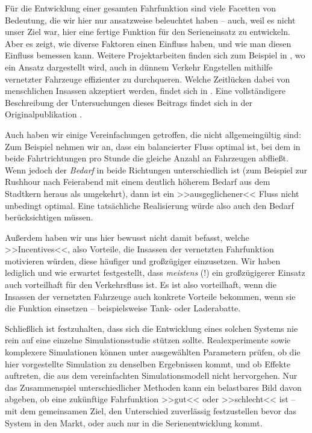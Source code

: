 Für die Entwicklung einer gesamten Fahrfunktion sind viele Facetten von Bedeutung, die wir hier nur ansatzweise beleuchtet haben -- auch, weil es nicht unser Ziel war, hier eine fertige Funktion für den Serieneinsatz zu entwickeln. Aber es zeigt, wie diverse Faktoren einen Einfluss haben, und wie man diesen Einfluss bemessen kann. Weitere Projektarbeiten finden sich zum Beispiel in \cite{naumann2017cooperativePlanning}, wo ein Ansatz dargestellt wird, auch in dünnem Verkehr Engstellen mithilfe vernetzter Fahrzeuge effizienter zu durchqueren. Welche Zeitlücken dabei von menschlichen Insassen akzeptiert werden, findet sich in \cite{ehrhardt2021gap}. Eine vollständigere Beschreibung der Untersuchungen dieses Beitrags findet sich in der Originalpublikation \cite{ziehn2023cooperative}.

Auch haben wir einige Vereinfachungen getroffen, die nicht allgemeingültig sind: Zum Beispiel nehmen wir an, dass ein balancierter Fluss optimal ist, bei dem in beide Fahrtrichtungen pro Stunde die gleiche Anzahl an Fahrzeugen abfließt. Wenn jedoch der \emph{Bedarf} in beide Richtungen unterschiedlich ist (zum Beispiel zur Rushhour nach Feierabend mit einem deutlich höherem Bedarf aus dem Stadtkern heraus als umgekehrt), dann ist ein >>ausgeglichener<< Fluss nicht unbedingt optimal. Eine tatsächliche Realisierung würde also auch den Bedarf berücksichtigen müssen.

Außerdem haben wir uns hier bewusst nicht damit befasst, welche >>Incentives<<, also Vorteile, die Insassen der vernetzten Fahrfunktion motivieren würden, diese häufiger und großzügiger einzusetzen. Wir haben lediglich und wie erwartet festgestellt, dass \emph{meistens} (!) ein großzügigerer Einsatz auch vorteilhaft für den Verkehrsfluss ist. Es ist also vorteilhaft, wenn die Insassen der vernetzten Fahrzeuge auch konkrete Vorteile bekommen, wenn sie die Funktion einsetzen -- beispielsweise Tank- oder Laderabatte.

Schließlich ist festzuhalten, dass sich die Entwicklung eines solchen Systems nie rein auf eine einzelne Simulationsstudie stützen sollte. Realexperimente sowie komplexere Simulationen können unter ausgewählten Parametern prüfen, ob die hier vorgestellte Simulation zu denselben Ergebnissen kommt, und ob Effekte auftreten, die aus dem vereinfachten Simulationsmodell nicht hervorgehen. Nur das Zusammenspiel unterschiedlicher Methoden kann ein belastbares Bild davon abgeben, ob eine zukünftige Fahrfunktion >>gut<< oder >>schlecht<< ist -- mit dem gemeinsamen Ziel, den Unterschied zuverlässig festzustellen bevor das System in den Markt, oder auch nur in die Serienentwicklung kommt. \markEndOfContent





\nocite{ziehn2023cooperative}

\printbibliography[heading=subbibliography]
